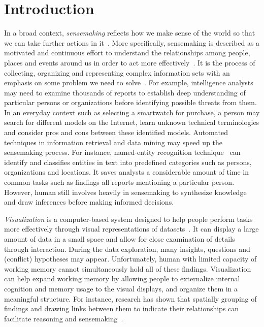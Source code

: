 \chapter{Introduction}

\graphicspath{{Chapter1/figures/}}



In a broad context, \emph{sensemaking} reflects how we make sense of the world so that we can take further actions in it~\cite{Snowden2005}. More specifically, sensemaking is described as a motivated and continuous effort to understand the relationships among people, places and events around us in order to act more effectively~\cite{Klein2006a}. It is the process of collecting, organizing and representing complex information sets with an emphasis on some problem we need to solve~\cite{Russell2008}. For example, intelligence analysts may need to examine thousands of reports to establish deep understanding of particular persons or organizations before identifying possible threats from them. In an everyday context such as selecting a smartwatch for purchase, a person may search for different models on the Internet, learn unknown technical terminologies and consider pros and cons between these identified models. Automated techniques in information retrieval and data mining may speed up the sensemaking process. For instance, named-entity recognition technique~\cite{Nadeau2007} can identify and classifies entities in text into predefined categories such as persons, organizations and locations. It saves analysts a considerable amount of time in common tasks such as findings all reports mentioning a particular person. However, human still involves heavily in sensemaking to synthesize knowledge and draw inferences before making informed decisions.

\emph{Visualization} is a computer-based system designed to help people perform tasks more effectively through visual representations of datasets~\cite{Munzner2014}. It can display a large amount of data in a small space and allow for close examination of details through interaction. During the data exploration, many insights, questions and (conflict) hypotheses may appear. Unfortunately, human with limited capacity of working memory cannot simultaneously hold all of these findings. Visualization can help expand working memory by allowing people to externalize internal cognition and memory usage to the visual displays, and organize them in a meaningful structure. For instance, research has shown that spatially grouping of findings and drawing links between them to indicate their relationships can facilitate reasoning and sensemaking~\cite{Sedig2013}.

